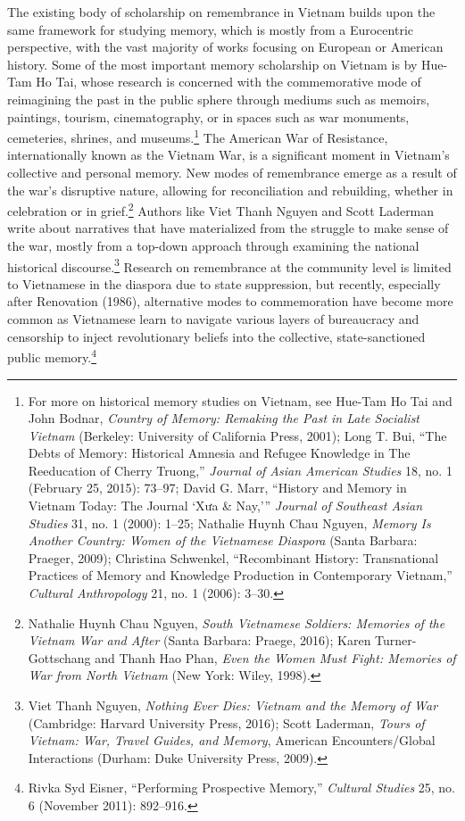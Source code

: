 The existing body of scholarship on remembrance in Vietnam builds upon the same framework for studying memory, which is mostly from a Eurocentric perspective, with the vast majority of works focusing on European or American history. Some of the most important memory scholarship on Vietnam is by Hue-Tam Ho Tai, whose research is concerned with the commemorative mode of reimagining the past in the public sphere through mediums such as memoirs, paintings, tourism, cinematography, or in spaces such as war monuments, cemeteries, shrines, and museums.\footnote{For more on historical memory studies on Vietnam, see Hue-Tam Ho Tai and John Bodnar, \textit{Country of Memory: Remaking the Past in Late Socialist Vietnam} (Berkeley: University of California Press, 2001); Long T. Bui, “The Debts of Memory: Historical Amnesia and Refugee Knowledge in The Reeducation of Cherry Truong,” \textit{Journal of Asian American Studies} 18, no. 1 (February 25, 2015): 73–97; David G. Marr, “History and Memory in Vietnam Today: The Journal ‘Xưa \& Nay,’” \textit{Journal of Southeast Asian Studies} 31, no. 1 (2000): 1–25; Nathalie Huynh Chau Nguyen, \textit{Memory Is Another Country: Women of the Vietnamese Diaspora} (Santa Barbara: Praeger, 2009); Christina Schwenkel, “Recombinant History: Transnational Practices of Memory and Knowledge Production in Contemporary Vietnam,” \textit{Cultural Anthropology} 21, no. 1 (2006): 3–30.} The American War of Resistance, internationally known as the Vietnam War, is a significant moment in Vietnam’s collective and personal memory. New modes of remembrance emerge as a result of the war’s disruptive nature, allowing for reconciliation and rebuilding, whether in celebration or in grief.\footnote{Nathalie Huynh Chau Nguyen, \textit{South Vietnamese Soldiers: Memories of the Vietnam War and After} (Santa Barbara: Praege, 2016); Karen Turner-Gottschang and Thanh Hao Phan, \textit{Even the Women Must Fight: Memories of War from North Vietnam} (New York: Wiley, 1998).} Authors like Viet Thanh Nguyen and Scott Laderman write about narratives that have materialized from the struggle to make sense of the war, mostly from a top-down approach through examining the national historical discourse.\footnote{Viet Thanh Nguyen, \textit{Nothing Ever Dies: Vietnam and the Memory of War} (Cambridge: Harvard University Press, 2016); Scott Laderman, \textit{Tours of Vietnam: War, Travel Guides, and Memory}, American Encounters/Global Interactions (Durham: Duke University Press, 2009).} Research on remembrance at the community level is limited to Vietnamese in the diaspora due to state suppression, but recently, especially after Renovation (1986), alternative modes to commemoration have become more common as Vietnamese learn to navigate various layers of bureaucracy and censorship to inject revolutionary beliefs into the collective, state-sanctioned public memory.\footnote{Rivka Syd Eisner, “Performing Prospective Memory,” \textit{Cultural Studies} 25, no. 6 (November 2011): 892–916.}

